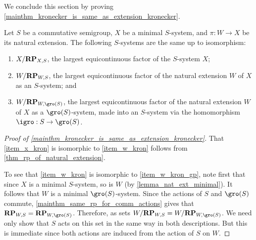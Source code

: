 We conclude this section by proving \cref{mainthm_kronecker_is_same_as_extension_kronecker}.

\begin{theorem}
    \label{mainthm_kronecker_is_same_as_extension_kronecker}
    Let $S$ be a commutative semigroup, $X$ be a minimal $S$-system, and $\pi: W \to X$ be its natural extension. The following $S$-systems are the same up to isomorphism:
    \begin{enumerate}
        \item \label{item_x_kron}
        $X/\mathbf{RP}_{X,S}$, the largest equicontinuous factor of the $S$-system $X$;
        \item \label{item_w_kron}
        $W / \mathbf{RP}_{W,S}$, the largest equicontinuous factor of the natural extension $W$ of $X$ as an $S$-system; and
        \item \label{item_w_kron_gp}
        $W / \RP_{W,\gro(S)}$, the largest equicontinuous factor of the natural extension $W$ of $X$ as a $\gro(S)$-system, made into an $S$-system via the homomorphism $\igro: S \to \gro(S)$.
    \end{enumerate}
\end{theorem}

\begin{proof}[Proof of \cref{mainthm_kronecker_is_same_as_extension_kronecker}]
    That \eqref{item_x_kron} is isomorphic to \eqref{item_w_kron} follows from \cref{thm_rp_of_natural_extension}.
    
    To see that \eqref{item_w_kron} is isomorphic to \eqref{item_w_kron_gp}, note first that since $X$ is a minimal $S$-system,  so is $W$ (by \cref{lemma_nat_ext_minimal}). It follows that $W$ is a minimal $\gro(S)$-system. Since the actions of $S$ and $\gro(S)$ commute, \cref{mainthm_same_rp_for_comm_actions} gives that $\RP_{W,S} = \RP_{W,\gro(S)}$.  Therefore, as sets $W / \RP_{W,S} = W / \RP_{W,\gro(S)}$.  We need only show that $S$ acts on this set in the same way in both descriptions.  But this is immediate since both actions are induced from the action of $S$ on $W$.
\end{proof}